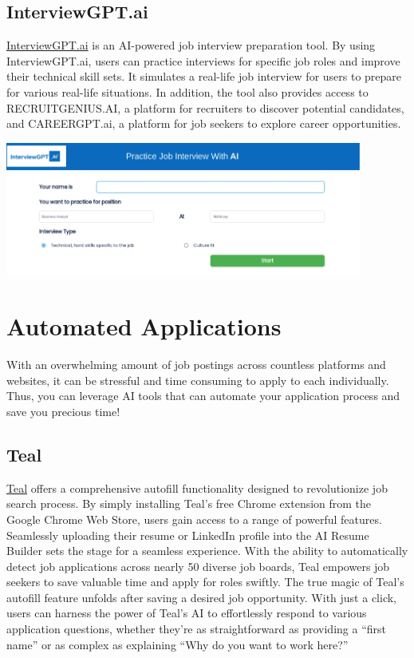 \documentclass[
]{book}
\begin{document}
\hypertarget{interviewgpt.ai}{%
\section{InterviewGPT.ai}\label{interviewgpt.ai}}

\href{https://interviewgpt.ai/}{InterviewGPT.ai} is an AI-powered job interview preparation tool. By using InterviewGPT.ai, users can practice interviews for specific job roles and improve their technical skill sets. It simulates a real-life job interview for users to prepare for various real-life situations. In addition, the tool also provides access to RECRUITGENIUS.AI, a platform for recruiters to discover potential candidates, and CAREERGPT.ai, a platform for job seekers to explore career opportunities.

\includegraphics[width=4.61458in,height=\textheight]{intergptai pic.png}

\hypertarget{automated-applications}{%
\chapter{Automated Applications}\label{automated-applications}}

With an overwhelming amount of job postings across countless platforms and websites, it can be stressful and time consuming to apply to each individually. Thus, you can leverage AI tools that can automate your application process and save you precious time!

\hypertarget{teal}{%
\section{Teal}\label{teal}}

\href{https://www.tealhq.com/tools/autofill-job-applications}{Teal} offers a comprehensive autofill functionality designed to revolutionize job search process. By simply installing Teal's free Chrome extension from the Google Chrome Web Store, users gain access to a range of powerful features. Seamlessly uploading their resume or LinkedIn profile into the AI Resume Builder sets the stage for a seamless experience. With the ability to automatically detect job applications across nearly 50 diverse job boards, Teal empowers job seekers to save valuable time and apply for roles swiftly. The true magic of Teal's autofill feature unfolds after saving a desired job opportunity. With just a click, users can harness the power of Teal's AI to effortlessly respond to various application questions, whether they're as straightforward as providing a ``first name'' or as complex as explaining ``Why do you want to work here?''
\end{document}
